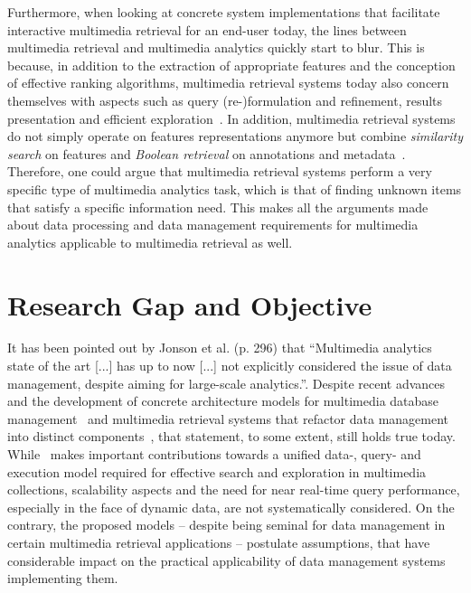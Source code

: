 Furthermore, when looking at concrete system implementations that facilitate interactive multimedia retrieval for an end-user today, the lines between multimedia retrieval and multimedia analytics quickly start to blur. This is because, in addition to the extraction of appropriate features and the conception of effective ranking algorithms, multimedia retrieval systems today also concern themselves with aspects such as query (re-)formulation and refinement, results presentation and efficient exploration~\cite{Lokovc:2019interactive}. In addition, multimedia retrieval systems do not simply operate on features representations anymore but combine \emph{similarity search} on features and \emph{Boolean retrieval} on annotations and metadata~\cite{Rossetto:2020interactive}. Therefore, one could argue that multimedia retrieval systems perform a very specific type of multimedia analytics task, which is that of finding unknown items that satisfy a specific information need. This makes all the arguments made about data processing and data management requirements for multimedia analytics applicable to multimedia retrieval as well.

\section{Research Gap and Objective}
\label{section:research_gap}

It has been pointed out by Jonson et al. \cite{Jonson:2016} (p. 296) that ``Multimedia analytics state of the art [...] has up to now [...] not explicitly considered the issue of data management, despite aiming for large-scale analytics.''. Despite recent advances and the development of concrete architecture models for multimedia database management~\cite{Giangreco:2016adam,Giangreco:2018thesis} and multimedia retrieval systems that refactor data management into distinct components~\cite{Rossetto:2018thesis}, that statement, to some extent, still holds true today. While~\cite{Giangreco:2018thesis} makes important contributions towards a unified data-, query- and execution model required for effective search and exploration in multimedia collections, scalability aspects and the need for near real-time query performance, especially in the face of dynamic data, are not systematically considered. On the contrary, the proposed models -- despite being seminal for data management in certain multimedia retrieval applications -- postulate assumptions, that have considerable impact on the practical applicability of data management systems implementing them.

